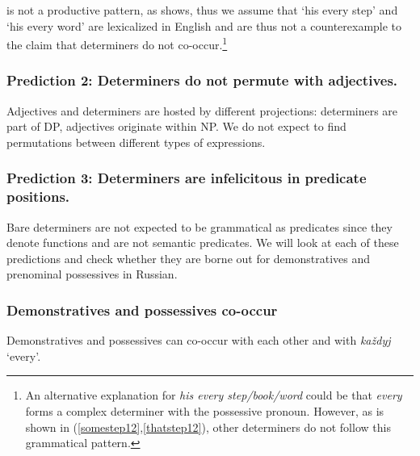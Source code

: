 \documentclass[output=paper,
colorlinks,
citecolor=brown,
newtxmath
]{langscibook}
\begin{document}
 is not a productive pattern, as  shows, thus we assume that `his every step' and `his every word' are lexicalized in English and are thus not a counter\-example to the claim that determiners do not co-occur.\footnote{An alternative explanation for \textit{his every step/book/word} could be that \textit{every} forms a complex determiner with the possessive pronoun. However, as is shown in (\ref{somestep12},\ref{thatstep12}), other determiners do not follow this grammatical pattern.}


\ea\label{false}
    \label{somestep12}
    \label{thatstep12}
\z\z

\subsubsection*{Prediction 2: Determiners do not permute with adjectives.}

\noindent Adjectives and determiners are hosted by different projections: determiners are part of DP, adjectives originate within NP. We do not expect to find permutations between different types of expressions.


\z

\subsubsection*{Prediction 3: Determiners are infelicitous in predicate positions.}

Bare determiners are not expected to be grammatical as predicates since they denote functions and are not semantic predicates. We will look at each of these predictions and check whether they are borne out for demonstratives and prenominal possessives in Russian. 


\subsubsection{Demonstratives and possessives co-occur}

Demonstratives and possessives can co-occur with each other and with \textit{každyj} `every'.

\end{document}
